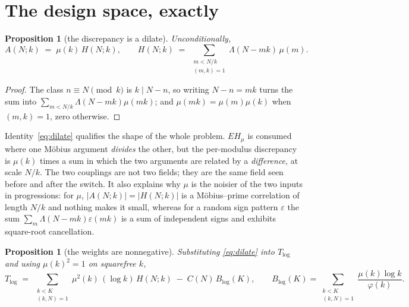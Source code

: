 \documentclass[11pt,a4paper]{article}
\theoremstyle{plain}
\newtheorem{proposition}[theorem]{Proposition}
\theoremstyle{definition}
\theoremstyle{remark}
\begin{document}
\section{The design space, exactly}\label{sec:identities}

\begin{proposition}[the discrepancy is a dilate]\label{prop:dilate}
Unconditionally,
\begin{equation}\label{eq:dilate}
  A(N;k)\;=\;\mu(k)\,H(N;k),
  \qquad
  H(N;k)\;=\;\sum_{\substack{m<N/k\\ (m,k)=1}}\Lambda(N-mk)\,\mu(m).
\end{equation}
\end{proposition}

\begin{proof}
The class $n\equiv N\pmod k$ is $k\mid N-n$, so writing $N-n=mk$ turns
the sum into $\sum_{m<N/k}\Lambda(N-mk)\mu(mk)$; and
$\mu(mk)=\mu(m)\mu(k)$ when $(m,k)=1$, zero otherwise.
\end{proof}

Identity~\eqref{eq:dilate} qualifies the shape of the whole problem.
$EH_\mu$ is consumed where one M\"obius argument \emph{divides} the
other, but the per-modulus discrepancy is $\mu(k)$ times a sum in
which the two arguments are related by a \emph{difference}, at scale
$N/k$. The two couplings are not two fields; they are the same field
seen before and after the switch. It also explains why $\mu$ is the
noisier of the two inputs in progressions: for $\mu$,
$|A(N;k)|=|H(N;k)|$ is a M\"obius--prime correlation of length $N/k$
and nothing makes it small, whereas for a random sign pattern
$\varepsilon$ the sum $\sum_m\Lambda(N-mk)\varepsilon(mk)$ is a sum of
independent signs and exhibits square-root cancellation.

\begin{proposition}[the weights are nonnegative]\label{prop:posweights}
Substituting \eqref{eq:dilate} into $T_{\log}$ and using $\mu(k)^2=1$
on squarefree $k$,
\begin{equation}\label{eq:posweights}
  T_{\log}\;=\;\sum_{\substack{k<K\\(k,N)=1}}
    \mu^2(k)\,(\log k)\,H(N;k)\;-\;C(N)\,B_{\log}(K),
  \qquad
  B_{\log}(K)=\!\!\sum_{\substack{k<K\\(k,N)=1}}\!\!
     \frac{\mu(k)\log k}{\varphi(k)} .
\end{equation}
\end{proposition}
\end{document}
